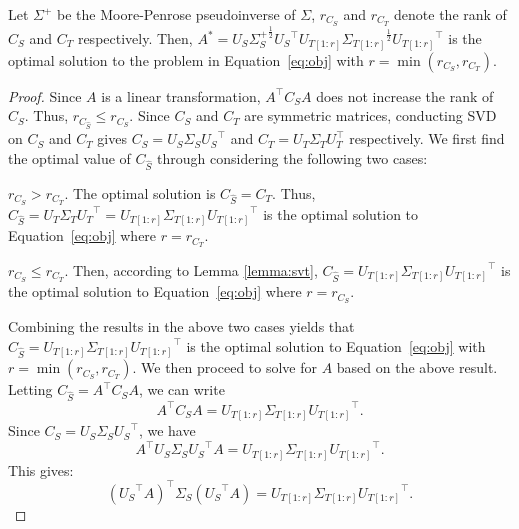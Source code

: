 \documentclass[graybox]{svmult}
\begin{document}
\begin{theorem} 
Let $\Sigma^{+}$ be the Moore-Penrose pseudoinverse of $\Sigma$, $r_{C_S}$ and $r_{C_T}$ denote the rank of $C_S$ and $C_T$ respectively.
Then, $A^{*} = U_{S}{\Sigma_S^{+}}^{\frac{1}{2}}{U_{S}}^{\top} U_{T[1:r]}{\Sigma_{T[1:r]}}^{\frac{1}{2}}{U_{T[1:r]}}^{\top}$ is the optimal solution to the problem in Equation~\eqref{eq:obj} with $r = \min(r_{C_S}, r_{C_T})$.
\end{theorem}
\begin{proof}  Since $A$ is a linear transformation, $A^{\top}C_SA$ does not increase the rank of $C_S$. Thus, $r_{C_{\hat{S}}}\leqslant{r_{C_{S}}}$. Since $C_S$ and $C_T$ are symmetric matrices, conducting SVD on $C_S$ and $C_T$ gives $C_S=U_S{\Sigma_S}{U_S}^{\top}$ and $C_T = U_T\Sigma_TU_T^\top$ respectively. We first find the optimal value of $C_{\hat{S}}$ through considering the following two  cases:
\vspace{-0.05in}
\begin{case}
$r_{C_S}>{r_{C_T}}$. The optimal solution is $C_{\hat{S}} = C_T$. Thus, $C_{\hat{S}} = U_{T}{\Sigma_{T}}{U_{T}}^{\top} = U_{T[1:r]}{\Sigma_{T[1:r]}}{U_{T[1:r]}}^{\top}$ is the optimal solution to Equation~\eqref{eq:obj} where $r = r_{C_T}$.
\end{case}
\vspace{-0.05in}
\begin{case}
$r_{C_S}\leqslant{r_{C_T}}$. Then, according to Lemma \ref{lemma:svt}, $C_{\hat{S}} = U_{T[1:r]}{\Sigma_{T[1:r]}}{U_{T[1:r]}}^{\top}$ is the optimal solution to Equation~\eqref{eq:obj} where $r = r_{C_S}$.
\end{case}
Combining the results in the above two cases yields that ${{C_{\hat{S}}}} = U_{T[1:r]}{\Sigma_{T[1:r]}}{U_{T[1:r]}}^{\top}$ is the optimal solution to Equation~\eqref{eq:obj} with $r = \min(r_{C_S}, r_{C_T})$.
We then proceed to solve for $A$ based on the above result. 
Letting $C_{\hat{S}} = {A}^{\top}C_S A$, we can write
\begin{equation*}
{A}^{\top}C_{S}{A}= U_{T[1:r]}{\Sigma_{T[1:r]}}{U_{T[1:r]}}^{\top}.
\end{equation*}
Since $C_S = U_S \Sigma_S {U_S}^\top$, we have
\begin{equation*}
{A}^{\top}U_S{\Sigma_S}{U_S}^{\top}{A}= U_{T[1:r]}{\Sigma_{T[1:r]}}{U_{T[1:r]}}^{\top}.
\end{equation*}
This gives:
\begin{equation*}
{({U_S}^{\top}A)}^{\top}{\Sigma_S}({U_S}^{\top}{A})= U_{T[1:r]}{\Sigma_{T[1:r]}}{U_{T[1:r]}}^{\top}.

\end{equation*}
\end{proof}
\end{document}
